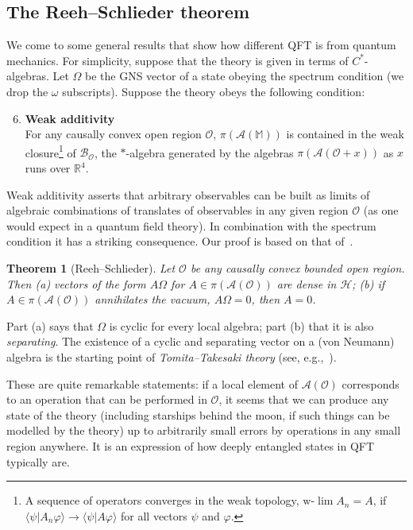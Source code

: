 \documentclass[12pt]{article}
\newcommand{\1}{\mathds{1}}                         %
\newcommand{\RR}{\mathbb{R}}           %
\newcommand{\Ocal}{\mathcal{O}}
\newcommand{\MM}{\mathbb{M}}
\newcommand{\HH}{{\mathcal{H}}}
\newcommand{\Ac}{{\mathcal{A}}}
\newcommand{\Bc}{{\mathcal{B}}}
\newcommand{\ip}[2]{\langle #1|#2\rangle}
\newtheorem{theorem}{Theorem}%
\begin{document}
\subsection{The Reeh--Schlieder theorem} We come to some general results that show how different
QFT is from quantum mechanics. For simplicity, suppose that the theory is given in terms of $C^*$-algebras. Let $\Omega$ be the GNS vector of a state obeying the spectrum condition (we drop the $\omega$ subscripts). Suppose the theory obeys the following condition: 
\begin{enumerate}[label=\bf A\arabic{enumi},leftmargin=*,widest=4]\setcounter{enumi}{5}
	\item {\bf Weak additivity}\\
	For any causally convex open region $\Ocal$,  $\pi(\Ac(\MM))$ is contained in the weak closure\footnote{A sequence of operators converges in the weak topology, $\text{w-}\lim A_n = A$, if $\ip{\psi}{A_n\varphi}\to \ip{\psi}{A\varphi}$ for all vectors $\psi$ and $\varphi$.}  of $\Bc_\Ocal$, the $*$-algebra generated by the algebras $\pi(\Ac(\Ocal+x))$ as $x$ runs over $\RR^4$. 
\end{enumerate}
Weak additivity asserts that arbitrary observables can be built as limits of
algebraic combinations of translates of 
observables in any given region $\Ocal$ (as one would expect in a quantum field theory). In combination with
the spectrum condition it has a striking consequence. Our proof is based on that of~\cite{Araki}.

\begin{theorem}[Reeh--Schlieder] Let $\Ocal$ be any causally convex bounded open region. Then (a)
	vectors of the form $A\Omega$ for $A\in\pi(\Ac(\Ocal))$ are dense in $\HH$; (b) if $A\in\pi(\Ac(\Ocal))$ annihilates the vacuum, $A\Omega=0$, then $A=0$. 
\end{theorem}
Part (a) says that $\Omega$ is cyclic for every local algebra; part (b) that it is also \emph{separating}. The existence of a cyclic and separating vector on a (von Neumann) algebra is the starting point of \emph{Tomita--Takesaki theory} (see, e.g.,~\cite{BratRob:vol1}). 

These are quite remarkable statements: if a local element of $\Ac(\Ocal)$ corresponds to an operation that can be performed in $\Ocal$, it seems that we can produce any state of the theory (including starships behind the moon, if such things can be modelled by the theory) up to arbitrarily small errors by operations in any small region anywhere. It is an expression of how deeply entangled states in QFT typically are. 
\end{document}

